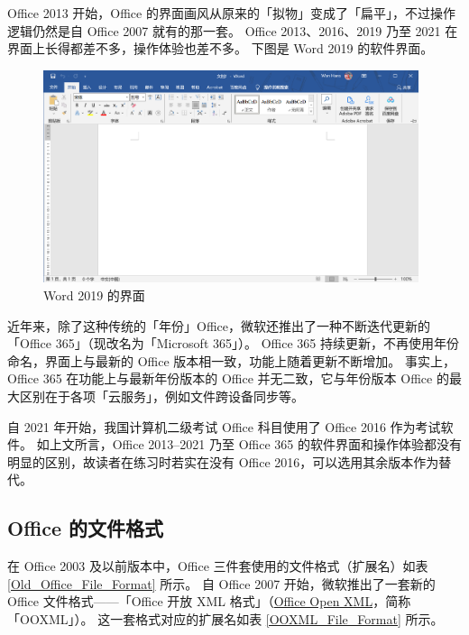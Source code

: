Office 2013 开始，Office 的界面画风从原来的「拟物」变成了「扁平」，不过操作逻辑仍然是自 Office 2007 就有的那一套。
Office 2013、2016、2019 乃至 2021 在界面上长得都差不多，操作体验也差不多。
下图是 Word 2019 的软件界面。

\begin{figure}[htb!]
  \centering
  \includegraphics[width=11cm]{assets/Word_2019.png}
  \caption{Word 2019 的界面}
  \label{Word_2019}
\end{figure}

近年来，除了这种传统的「年份」Office，微软还推出了一种不断迭代更新的「Office 365」（现改名为「Microsoft 365」）。
Office 365 持续更新，不再使用年份命名，界面上与最新的 Office 版本相一致，功能上随着更新不断增加。
事实上，Office 365 在功能上与最新年份版本的 Office 并无二致，它与年份版本 Office 的最大区别在于各项「云服务」，例如文件跨设备同步等。

\begin{note}
  自 2021 年开始，我国计算机二级考试 Office 科目使用了 Office 2016 作为考试软件。
  如上文所言，Office 2013--2021 乃至 Office 365 的软件界面和操作体验都没有明显的区别，故读者在练习时若实在没有 Office 2016，可以选用其余版本作为替代。
\end{note}

\subsection{Office 的文件格式}

在 Office 2003 及以前版本中，Office 三件套使用的文件格式（扩展名）如表 \ref{Old_Office_File_Format} 所示。
自 Office 2007 开始，微软推出了一套新的 Office 文件格式——「Office 开放 XML 格式」（\href{http://officeopenxml.com/}{Office Open XML}，简称「OOXML」）。
这一套格式对应的扩展名如表 \ref{OOXML_File_Format} 所示。

